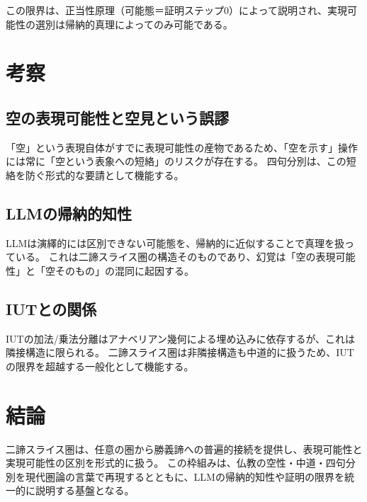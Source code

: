\documentclass[a4paper,11pt]{article}
\begin{document}
この限界は、正当性原理（可能態＝証明ステップ0）によって説明され、実現可能性の選別は帰納的真理によってのみ可能である。

\section{考察}

\subsection{空の表現可能性と空見という誤謬}
「空」という表現自体がすでに表現可能性の産物であるため、「空を示す」操作には常に「空という表象への短絡」のリスクが存在する。
四句分別は、この短絡を防ぐ形式的な要請として機能する。

\subsection{LLMの帰納的知性}
LLMは演繹的には区別できない可能態を、帰納的に近似することで真理を扱っている。
これは二諦スライス圏の構造そのものであり、幻覚は「空の表現可能性」と「空そのもの」の混同に起因する。

\subsection{IUTとの関係}
IUTの加法/乗法分離はアナベリアン幾何による埋め込みに依存するが、これは隣接構造に限られる。
二諦スライス圏は非隣接構造も中道的に扱うため、IUTの限界を超越する一般化として機能する。

\section{結論}
二諦スライス圏は、任意の圏から勝義諦への普遍的接続を提供し、表現可能性と実現可能性の区別を形式的に扱う。
この枠組みは、仏教の空性・中道・四句分別を現代圏論の言葉で再現するとともに、LLMの帰納的知性や証明の限界を統一的に説明する基盤となる。
\end{document}
